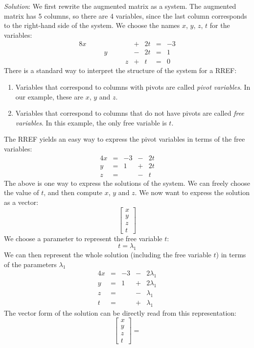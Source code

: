 \documentclass[12pt]{article}
\begin{document}
\begin{enumerate}
\emph{Solution}:
We first rewrite the augmented matrix as a system. The augmented matrix has 5 columns, so there are 4 variables, since the last column corresponds to the right-hand side of the system. We choose the names $x$, $y$, $z$, $t$ for the variables:
\begin{alignat*}{8}
x &{}\quad{}&   &{}\quad{}&   &{}+{}& 2t &{}={}& -3\\
  &{}{}& y &{}{}&   &{}-{}& 2t &{}={}&  1\\
  &{}{}&   &{}{}& z &{}+{}&  t &{}={}&  0 
\end{alignat*}
There is a standard way to interpret the structure of the system for a RREF:
\begin{enumerate}
\item Variables that correspond to columns with pivots are called \emph{pivot variables}. In our example, these are $x$, $y$ and $z$.
\item Variables that correspond to columns that do not have pivots are called \emph{free variables}. In this example, the only free variable is $t$. 
\end{enumerate}
The RREF yields an easy way to express the pivot variables in terms of the free variables:
\begin{alignat*}{4}
x &{}={}& -3 &{}-{}& 2t\\
y &{}={}&  1 &{}+{}& 2t\\
z &{}={}&    &{}-{}& t
\end{alignat*}
The above is one way to express the solutions of the system. We can freely choose the value of $t$, and then compute $x$, $y$ and $z$. We now want to express the solution as a vector:
\[
\begin{bmatrix}x\\y\\z\\t\end{bmatrix}
\]
We choose a parameter to represent the free variable $t$:
\[
t=\lambda_1
\]
We can then represent the whole solution (including the free variable $t$) in terms of the parameters $\lambda_1$
\begin{alignat*}{4}
x &{}={}& -3 &{}-{}& 2\lambda_1\\
y &{}={}&  1 &{}+{}& 2\lambda_1\\
z &{}={}&    &{}-{}&  \lambda_1\\
t &{}={}&    &{}+{}&  \lambda_1
\end{alignat*}
The vector form of the solution can be directly read from this representation:
\[
\begin{bmatrix}x\\y\\z\\t\end{bmatrix}=
\]
\end{enumerate}
\end{document}
